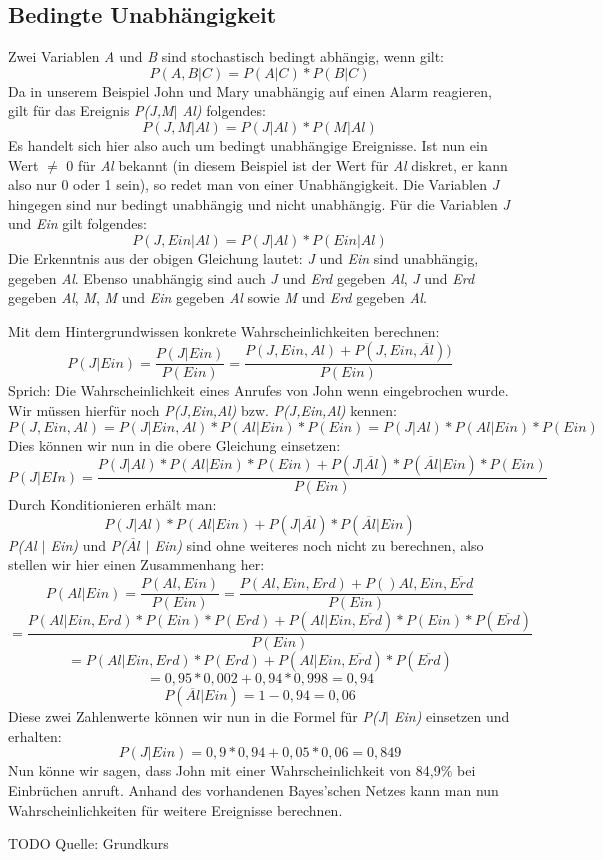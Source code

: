 \subsection{Bedingte Unabhängigkeit}  
Zwei Variablen \textit{A} und \textit{B} sind stochastisch bedingt abhängig, wenn gilt:
\[ P(A,B\vert C) = P(A\vert C) * P(B\vert C)\]
Da in unserem Beispiel John und Mary unabhängig auf einen Alarm reagieren, gilt für das Ereignis \textit{P(J,M$\vert$ Al)} folgendes:
\[ P(J,M\vert Al) = P(J\vert Al) * P(M\vert Al)\]
Es handelt sich hier also auch um bedingt unabhängige Ereignisse. Ist nun ein Wert $\neq$ 0 für \textit{Al} bekannt (in diesem Beispiel ist der Wert für \textit{Al} diskret, er kann also nur 0 oder 1 sein), so redet man von einer Unabhängigkeit. Die Variablen \textit{J} hingegen sind nur bedingt unabhängig und nicht unabhängig. 
Für die Variablen \textit{J} und \textit{Ein} gilt folgendes:
\[ P(J,Ein\vert Al) = P(J\vert Al) * P(Ein\vert Al)\]
Die Erkenntnis aus der obigen Gleichung lautet: \textit{J} und \textit{Ein} sind unabhängig, gegeben \textit{Al}. Ebenso unabhängig sind auch \textit{J} und \textit{Erd} gegeben \textit{Al}, \textit{J} und \textit{Erd} gegeben \textit{Al}, \textit{M}, \textit{M} und \textit{Ein} gegeben \textit{Al} sowie \textit{M} und \textit{Erd} gegeben \textit{Al}. 

Mit dem Hintergrundwissen konkrete Wahrscheinlichkeiten berechnen:
\[ P(J\vert Ein) = \frac{P(J\vert Ein)}{P(Ein)}  = \frac{P(J,Ein,Al) + P(J,Ein, \overline{Al}))}{P(Ein)} \]
Sprich: Die Wahrscheinlichkeit eines Anrufes von John wenn eingebrochen wurde.
Wir müssen hierfür noch \textit{P(J,Ein,Al)} bzw. \textit{P(J,Ein,Al)} kennen:
\[ P(J, Ein, Al) = P(J\vert Ein, Al) * P(Al\vert Ein) * P(Ein) = P(J\vert Al) * P(Al\vert Ein) * P(Ein) \] 
Dies können wir nun in die obere Gleichung einsetzen:
\[ P(J\vert EIn) =  \frac{P(J\vert	Al) * P(Al\vert Ein) * P(Ein) + P(J\vert \overline{Al}) * P(\overline{Al} \vert Ein) * P(Ein) }{P(Ein)}  \]
Durch Konditionieren erhält man:
\[ P(J\vert Al) * P(Al\vert Ein) + P(J\vert \overline{Al}) * P(\overline{Al} \vert Ein) \]
\textit{P(Al $\vert$ Ein)} und \textit{P($\overline{Al}$ $\vert$ Ein)} sind ohne weiteres noch nicht zu berechnen, also stellen wir hier einen Zusammenhang her:
\[ P(Al\vert Ein) = \frac{P(Al, Ein)}{P(Ein)} = \frac{P(Al,Ein,Erd) + P()Al,Ein, \overline{Erd} }{P(Ein)}  \]
\[ = \frac{P(Al\vert Ein, Erd) * P(Ein) * P(Erd) + P(Al\vert Ein, \overline{Erd}) * P(Ein) * P(\overline{Erd}) }{P(Ein)}\]
\[ = P(Al\vert Ein, Erd) * P(Erd) + P(Al\vert Ein, \overline{Erd}) * P(\overline{Erd}) \]
\[ = 0,95 * 0,002 + 0,94 * 0,998 = 0,94 \]
\[ P(\overline{Al}\vert Ein) = 1-0,94 = 0,06 \]
Diese zwei Zahlenwerte können wir nun in die Formel für \textit{P(J$\vert$ Ein)} einsetzen und erhalten:
\[ P(J\vert Ein) = 0,9 * 0,94 + 0,05 * 0,06 = 0,849 \]
Nun könne wir sagen, dass John mit einer Wahrscheinlichkeit von 84,9\% bei Einbrüchen anruft. Anhand des vorhandenen Bayes'schen Netzes kann man nun Wahrscheinlichkeiten für weitere Ereignisse berechnen. 

TODO Quelle: Grundkurs

